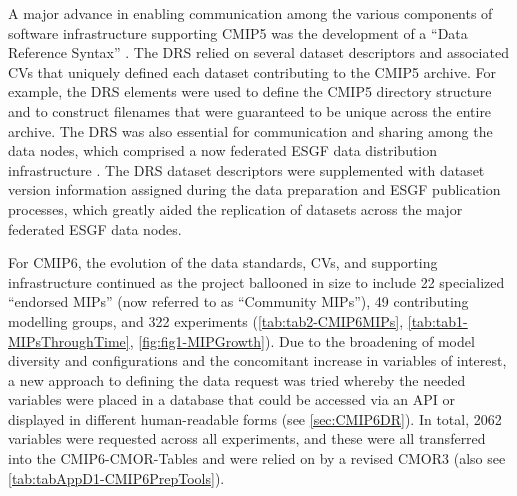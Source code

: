 \documentclass[manuscript]{copernicus}
\begin{document}
A major advance in enabling communication among the various components of software infrastructure supporting CMIP5 was the development of a ``Data Reference Syntax'' \citep[DRS;][]{taylor_pcmdi_2012}. The DRS relied on several dataset descriptors and associated CVs that uniquely defined each dataset contributing to the CMIP5 archive. For example, the DRS elements were used to define the CMIP5 directory structure and to construct filenames that were guaranteed to be unique across the entire archive. The DRS was also essential for communication and sharing among the data nodes, which comprised a now federated ESGF data distribution infrastructure \citep[\autoref{sec:earthSystemGridFederation};][]{williams_earth_2011}. The DRS dataset descriptors were supplemented with dataset version information assigned during the data preparation and ESGF publication processes, which greatly aided the replication of datasets across the major federated ESGF data nodes.

For CMIP6, the evolution of the data standards, CVs, and supporting infrastructure continued as the project ballooned in size to include 22 specialized ``endorsed MIPs'' (now referred to as ``Community MIPs''), 49 contributing modelling groups, and 322 experiments (\autoref{tab:tab2-CMIP6MIPs}, \autoref{tab:tab1-MIPsThroughTime}, \autoref{fig:fig1-MIPGrowth}). Due to the broadening of model diversity and configurations and the concomitant increase in variables of interest, a new approach to defining the data request was tried whereby the needed variables were placed in a database that could be accessed via an API or displayed in different human-readable forms (see \autoref{sec:CMIP6DR}). In total, 2062 variables were requested across all experiments, and these were all transferred into the CMIP6-CMOR-Tables \citep{nadeau_cmip6_2017} and were relied on by a revised CMOR3 \citep{mauzey_cmor_2024} (also see \autoref{tab:tabAppD1-CMIP6PrepTools}).
\end{document}
